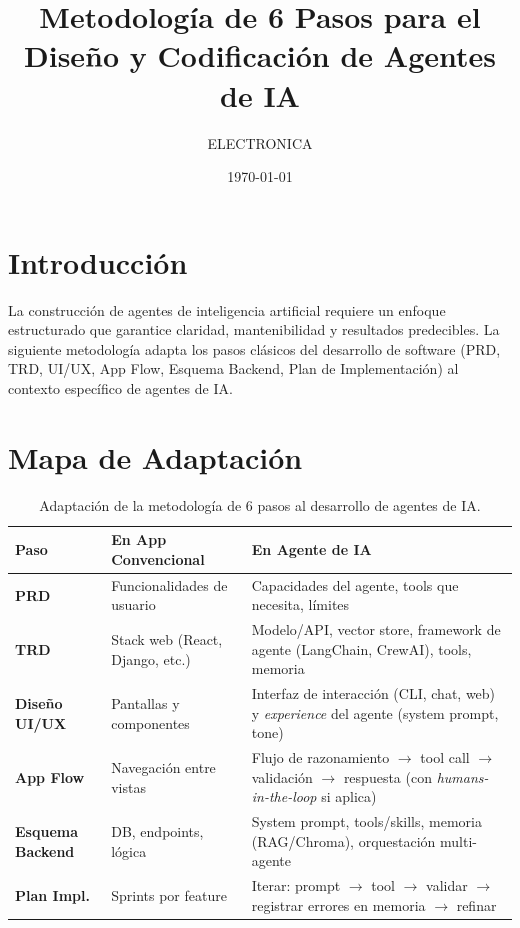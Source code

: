 \documentclass[12pt,a4paper]{article}
\title{Metodología de 6 Pasos para el\\Diseño y Codificación de Agentes de IA}
\author{ELECTRONICA}
\date{\today}
\begin{document}
\maketitle
\thispagestyle{empty}
\tableofcontents
\newpage

\section{Introducción}

La construcción de agentes de inteligencia artificial requiere un enfoque estructurado que garantice claridad, mantenibilidad y resultados predecibles. La siguiente metodología adapta los pasos clásicos del desarrollo de software (PRD, TRD, UI/UX, App Flow, Esquema Backend, Plan de Implementación) al contexto específico de agentes de IA.

\section{Mapa de Adaptación}

\begin{table}[h!]
\centering
\small
\begin{tabular}{>{\bfseries}p{3cm} p{5.5cm} p{5.5cm}}
\toprule
\textbf{Paso} & \textbf{En App Convencional} & \textbf{En Agente de IA} \\
\midrule
PRD & Funcionalidades de usuario & Capacidades del agente, tools que necesita, límites \\
\midrule
TRD & Stack web (React, Django, etc.) & Modelo/API, vector store, framework de agente (LangChain, CrewAI), tools, memoria \\
\midrule
Diseño UI/UX & Pantallas y componentes & Interfaz de interacción (CLI, chat, web) y \textit{experience} del agente (system prompt, tone) \\
\midrule
App Flow & Navegación entre vistas & Flujo de razonamiento $\rightarrow$ tool call $\rightarrow$ validación $\rightarrow$ respuesta (con \textit{humans-in-the-loop} si aplica) \\
\midrule
Esquema Backend & DB, endpoints, lógica & System prompt, tools/skills, memoria (RAG/Chroma), orquestación multi-agente \\
\midrule
Plan Impl. & Sprints por feature & Iterar: prompt $\rightarrow$ tool $\rightarrow$ validar $\rightarrow$ registrar errores en memoria $\rightarrow$ refinar \\
\bottomrule
\end{tabular}
\caption{Adaptación de la metodología de 6 pasos al desarrollo de agentes de IA.}
\label{tab:adaptacion}
\end{table}
\end{document}
